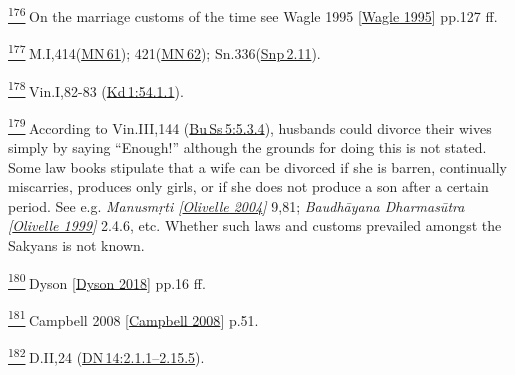 \label{footprints_split_024.html_fn176}
\hyperref[footprints_split_009.htmlux5cux23fnref176]{\textsuperscript{176}} On
the marriage customs of the time see {Wagle 1995
{{[}\hyperref[footprints_split_022.htmlux5cux23Wagleux5cux25201995]{Wagle
1995}{]}}} pp.127 ff.

\label{footprints_split_024.html_fn177}
\hyperref[footprints_split_009.htmlux5cux23fnref177]{\textsuperscript{177}} M.I,414(\href{https://suttacentral.net/mn61/en/sujato}{MN\,61});
421(\href{https://suttacentral.net/mn62/en/sujato}{MN\,62});
Sn.336(\href{https://suttacentral.net/snp2.11/en/sujato}{Snp\,2.11}).

\label{footprints_split_024.html_fn178}
\hyperref[footprints_split_009.htmlux5cux23fnref178]{\textsuperscript{178}} Vin.I,82-83
(\href{https://suttacentral.net/pli-tv-kd1/en/brahmali\#54.1.1}{Kd\,1:54.1.1}).

\label{footprints_split_024.html_fn179}
\hyperref[footprints_split_009.htmlux5cux23fnref179]{\textsuperscript{179}} According
to Vin.III,144
(\href{https://suttacentral.net/pli-tv-bu-vb-ss5/en/brahmali\#5.3.4}{Bu\,Ss\,5:5.3.4}),
husbands could divorce their wives simply by saying ``Enough!'' although
the grounds for doing this is not stated. Some law books stipulate that
a wife can be divorced if she is barren, continually miscarries,
produces only girls, or if she does not produce a son after a certain
period. See e.g. \emph{{Manusmṛti
{{[}\hyperref[footprints_split_022.htmlux5cux23Olivelleux5cux25202004]{Olivelle
2004}{]}}}} 9,81; \emph{{Baudhāyana Dharmasūtra
{{[}\hyperref[footprints_split_022.htmlux5cux23Olivelleux5cux25201999]{Olivelle
1999}{]}}}} 2.4.6, etc. Whether such laws and customs prevailed amongst
the Sakyans is not known.

\label{footprints_split_024.html_fn180}
\hyperref[footprints_split_009.htmlux5cux23fnref180]{\textsuperscript{180}} {Dyson
{{[}\hyperref[footprints_split_022.htmlux5cux23Dysonux5cux25202018]{Dyson
2018}{]}}} pp.16 ff.

\label{footprints_split_024.html_fn181}
\hyperref[footprints_split_009.htmlux5cux23fnref181]{\textsuperscript{181}} {Campbell
2008
{{[}\hyperref[footprints_split_023.htmlux5cux23Campbellux5cux25202008]{Campbell
2008}{]}}} p.51.

\label{footprints_split_024.html_fn182}
\hyperref[footprints_split_009.htmlux5cux23fnref182]{\textsuperscript{182}} D.II,24
(\href{https://suttacentral.net/dn14/en/sujato\#2.1.1}{DN\,14:2.1.1--2.15.5}).

